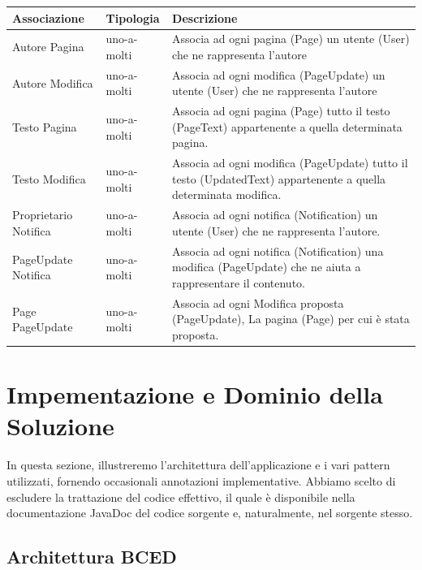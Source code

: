 \documentclass{article}
\begin{document}
{\begin{table}[H]
			
			\begin{tabularx}{\textwidth}{|l|l|X|}
				\hline
				\textbf{Associazione} &\textbf{Tipologia}  & \textbf{Descrizione} \\
				\hline
				Autore Pagina & uno-a-molti  & Associa ad ogni pagina (Page) un utente (User) che ne rappresenta l'autore
				\\
				\hline
				Autore Modifica & uno-a-molti  & Associa ad ogni modifica (PageUpdate) un utente (User) che ne rappresenta l'autore
				\\
				\hline
				Testo Pagina & uno-a-molti  & Associa ad ogni pagina (Page) tutto il testo (PageText) appartenente a quella determinata pagina.
				\\
				\hline
				Testo Modifica & uno-a-molti  & Associa ad ogni modifica (PageUpdate) tutto il testo (UpdatedText) appartenente a quella determinata modifica.
				\\
				\hline
				Proprietario Notifica & uno-a-molti  & Associa ad ogni notifica (Notification) un utente (User) che ne rappresenta l'autore.
				\\
				\hline
				PageUpdate Notifica & uno-a-molti  & Associa ad ogni notifica (Notification) una modifica (PageUpdate) che ne aiuta a rappresentare il contenuto.
				\\
				\hline
				Page PageUpdate & uno-a-molti  & Associa ad ogni Modifica proposta (PageUpdate), La pagina (Page) per cui \`e stata proposta. 
				\\
				\hline
			\end{tabularx}
		\end{table}
		
		\newpage
		
		\section{Impementazione e Dominio della Soluzione}
		
		In questa sezione, illustreremo l'architettura dell'applicazione e i vari pattern utilizzati, fornendo occasionali annotazioni implementative. Abbiamo scelto di escludere la trattazione del codice effettivo, il quale è disponibile nella documentazione JavaDoc del codice sorgente e, naturalmente, nel sorgente stesso.
		
		\subsection{Architettura BCED}
		
}
\end{document}
